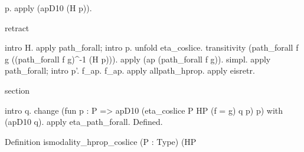 \begin{coqdoccode}
\begin{coqdoccomment}
p.\coqdocindent{0.50em}
\coqdoceol
\coqdocindent{1.00em}
apply\coqdocindent{0.50em}
(apD10\coqdocindent{0.50em}
(H\coqdocindent{0.50em}
p)).\coqdoceol
\coqdoceol
\coqdocindent{1.00em}
\begin{coqdoccomment}
\coqdocindent{0.50em}
retract\coqdocindent{0.50em}
\end{coqdoccomment}
\coqdoceol
\coqdocindent{1.00em}
intro\coqdocindent{0.50em}
H.\coqdoceol
\coqdocindent{1.00em}
apply\coqdocindent{0.50em}
path\_forall;\coqdocindent{0.50em}
intro\coqdocindent{0.50em}
p.\coqdoceol
\coqdocindent{1.00em}
unfold\coqdocindent{0.50em}
eta\_coslice.\coqdoceol
\coqdocindent{1.00em}
transitivity\coqdocindent{0.50em}
(path\_forall\coqdocindent{0.50em}
f\coqdocindent{0.50em}
g\coqdocindent{0.50em}
((path\_forall\coqdocindent{0.50em}
f\coqdocindent{0.50em}
g)\^{}-1\coqdocindent{0.50em}
(H\coqdocindent{0.50em}
p))).\coqdoceol
\coqdocindent{1.00em}
apply\coqdocindent{0.50em}
(ap\coqdocindent{0.50em}
(path\_forall\coqdocindent{0.50em}
f\coqdocindent{0.50em}
g)).\coqdoceol
\coqdocindent{1.00em}
simpl.\coqdocindent{0.50em}
apply\coqdocindent{0.50em}
path\_forall;\coqdocindent{0.50em}
intro\coqdocindent{0.50em}
p'.\coqdoceol
\coqdocindent{1.00em}
f\_ap.\coqdocindent{0.50em}
f\_ap.\coqdocindent{0.50em}
apply\coqdocindent{0.50em}
allpath\_hprop.\coqdoceol
\coqdocindent{1.00em}
apply\coqdocindent{0.50em}
eisretr.\coqdoceol
\coqdoceol
\coqdocindent{1.00em}
\begin{coqdoccomment}
\coqdocindent{0.50em}
section\coqdocindent{0.50em}
\end{coqdoccomment}
\coqdoceol
\coqdocindent{1.00em}
intro\coqdocindent{0.50em}
q.\coqdoceol
\coqdocindent{1.00em}
change\coqdocindent{0.50em}
(fun\coqdocindent{0.50em}
p\coqdocindent{0.50em}
:\coqdocindent{0.50em}
P\coqdocindent{0.50em}
=>\coqdocindent{0.50em}
apD10\coqdocindent{0.50em}
(eta\_coslice\coqdocindent{0.50em}
P\coqdocindent{0.50em}
HP\coqdocindent{0.50em}
(f\coqdocindent{0.50em}
=\coqdocindent{0.50em}
g)\coqdocindent{0.50em}
q\coqdocindent{0.50em}
p)\coqdocindent{0.50em}
p)\coqdoceol
\coqdocindent{4.50em}
with\coqdocindent{0.50em}
(apD10\coqdocindent{0.50em}
q).\coqdoceol
\coqdocindent{1.00em}
apply\coqdocindent{0.50em}
eta\_path\_forall.\coqdoceol
Defined.\coqdoceol
\end{coqdoccomment}
\coqdoceol
\coqdocemptyline
\coqdocnoindent
\begin{coqdoccomment}
\coqdoceol
Definition\coqdocindent{0.50em}
ismodality\_hprop\_coslice\coqdocindent{0.50em}
(P\coqdocindent{0.50em}
:\coqdocindent{0.50em}
Type)\coqdocindent{0.50em}
(HP\coqdocindent{0.50em}

\end{coqdoccomment}
\end{coqdoccode}
